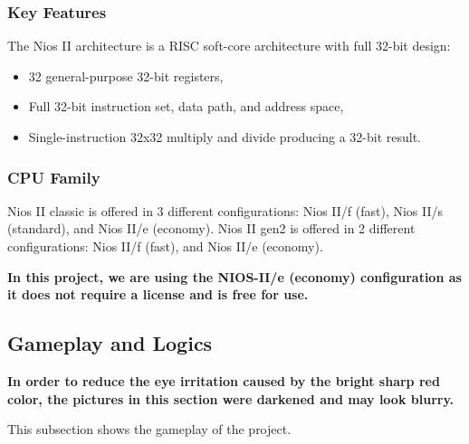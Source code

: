 \documentclass[conference]{IEEEtran}
\begin{document}
\subsubsection{Key Features}
The Nios II architecture is a RISC soft-core architecture with full 32-bit design:
\begin{itemize}
    \item 32 general-purpose 32-bit registers,
    \item Full 32-bit instruction set, data path, and address space,
    \item Single-instruction 32x32 multiply and divide producing a 32-bit result.
\end{itemize}

\subsubsection{CPU Family}
Nios II classic is offered in 3 different configurations: Nios II/f (fast), Nios II/s (standard), and Nios II/e (economy). Nios II gen2 is offered in 2 different configurations: Nios II/f (fast), and Nios II/e (economy).

\textbf{In this project, we are using the NIOS-II/e (economy) configuration as it does not require a license and is free for use.}

\subsection{Gameplay and Logics}
\textbf{In order to reduce the eye irritation caused by the bright sharp red color, the pictures in this section were darkened and may look blurry.}

This subsection shows the gameplay of the project. 
\end{document}
